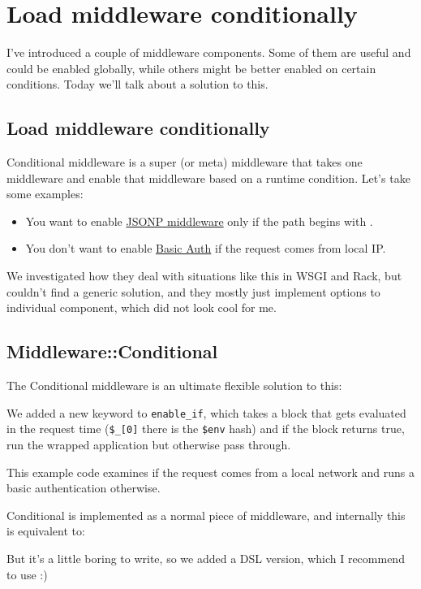 \chapter{Load middleware conditionally}
\label{day-18-load-middleware-conditionally}

I've introduced a couple of middleware components. Some of them are
useful and could be enabled globally, while others might be better
enabled on certain conditions. Today we'll talk about a solution to
this.

\section{Load middleware
conditionally}\label{load-middleware-conditionally}

Conditional middleware is a super (or meta) middleware that takes one
middleware and enable that middleware based on a runtime condition.
Let's take some examples:

\begin{itemize}
\itemsep1pt\parskip0pt
\item
  You want to enable
  \href{http://advent.plackperl.org/2009/12/day-16-adding-jsonp-support-to-your-app.html}{JSONP
  middleware} only if the path begins with .
\item
  You don't want to enable
  \href{http://advent.plackperl.org/2009/12/day-15-authenticate-your-app-with-middleware.html}{Basic
  Auth} if the request comes from local IP.
\end{itemize}

We investigated how they deal with situations like this in WSGI and
Rack, but couldn't find a generic solution, and they mostly just
implement options to individual component, which did not look cool for
me.

\section{Middleware::Conditional}\label{middlewareconditional}

The Conditional middleware is an ultimate flexible solution to this:


We added a new keyword to  \lstinline!enable_if!, which
takes a block that gets evaluated in the request time (\lstinline!$_[0]!
there is the \lstinline!$env! hash) and if the block returns true, run
the wrapped application but otherwise pass through.

This example code examines if the request comes from a local network and
runs a basic authentication otherwise.

Conditional is implemented as a normal piece of middleware, and
internally this is equivalent to:


But it's a little boring to write, so we added a DSL version, which I
recommend to use :)

